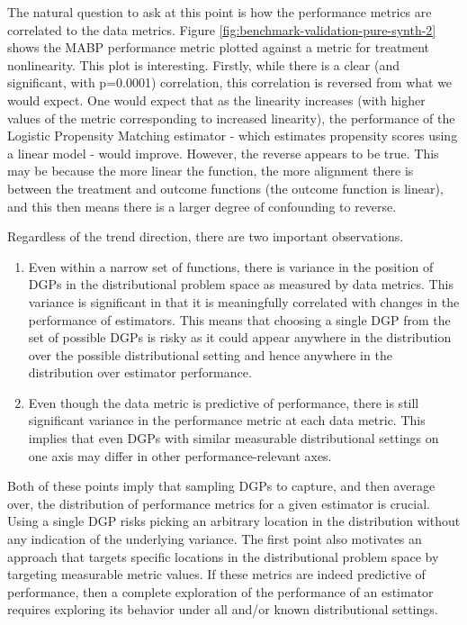 \documentclass[../main.tex]{subfiles}
\begin{document}
The natural question to ask at this point is how the performance metrics are correlated to the data metrics. Figure \ref{fig:benchmark-validation-pure-synth-2} shows the MABP performance metric plotted against a metric for treatment nonlinearity. This plot is interesting. Firstly, while there is a clear (and significant, with p=0.0001) correlation, this correlation is reversed from what we would expect. One would expect that as the linearity increases (with higher values of the metric corresponding to increased linearity), the performance of the Logistic Propensity Matching estimator - which estimates propensity scores using a linear model - would improve. However, the reverse appears to be true. This may be because the more linear the function, the more alignment there is between the treatment and outcome functions (the outcome function is linear), and this then means there is a larger degree of confounding to reverse.

\vspace{\baselineskip}

Regardless of the trend direction, there are two important observations.

\begin{enumerate}
    \item Even within a narrow set of functions, there is variance in the position of DGPs in the distributional problem space as measured by data metrics. This variance is significant in that it is meaningfully correlated with changes in the performance of estimators. This means that choosing a single DGP from the set of possible DGPs is risky as it could appear anywhere in the distribution over the possible distributional setting and hence anywhere in the distribution over estimator performance.
    
    \item Even though the data metric is predictive of performance, there is still significant variance in the performance metric at each data metric. This implies that even DGPs with similar measurable distributional settings on one axis may differ in other performance-relevant axes.
\end{enumerate}

Both of these points imply that sampling DGPs to capture, and then average over, the distribution of performance metrics for a given estimator is crucial. Using a single DGP risks picking an arbitrary location in the distribution without any indication of the underlying variance. The first point also motivates an approach that targets specific locations in the distributional problem space by targeting measurable metric values. If these metrics are indeed predictive of performance, then a complete exploration of the performance of an estimator requires exploring its behavior under all and/or known distributional settings.
\end{document}

